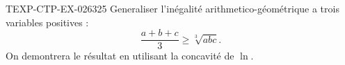 \begin{exercice}{TEXP-CTP-EX-026}{3}{25}
Generaliser l'inégalité arithmetico-géométrique a trois variables positives :
\[ \frac{a+b+c}{3} \geq \sqrt[3]{abc}. \]
On demontrera le résultat en utilisant la concavité de $\ln$.

\end{exercice}
